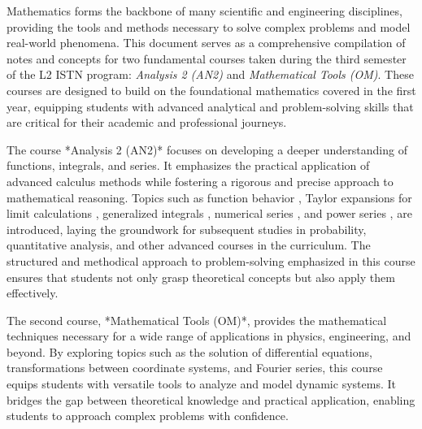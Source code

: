  \label{ch:Introduction}

Mathematics forms the backbone of many scientific and engineering disciplines, providing the tools and methods necessary to solve complex problems and model real-world phenomena. This document serves as a comprehensive compilation of notes and concepts for two fundamental courses taken during the third semester of the L2 ISTN program: \emph{Analysis 2 (AN2)} and \emph{Mathematical Tools (OM)}. These courses are designed to build on the foundational mathematics covered in the first year, equipping students with advanced analytical and problem-solving skills that are critical for their academic and professional journeys.

The course *Analysis 2 (AN2)* focuses on developing a deeper understanding of functions, integrals, and series. It emphasizes the practical application of advanced calculus methods while fostering a rigorous and precise approach to mathematical reasoning. Topics such as function behavior  , Taylor expansions for limit calculations , generalized integrals , numerical series , and power series , are introduced, laying the groundwork for subsequent studies in probability, quantitative analysis, and other advanced courses in the curriculum. The structured and methodical approach to problem-solving emphasized in this course ensures that students not only grasp theoretical concepts but also apply them effectively.

The second course, *Mathematical Tools (OM)*, provides the mathematical techniques necessary for a wide range of applications in physics, engineering, and beyond. By exploring topics such as the solution of differential equations, transformations between coordinate systems, and Fourier series, this course equips students with versatile tools to analyze and model dynamic systems. It bridges the gap between theoretical knowledge and practical application, enabling students to approach complex problems with confidence.
